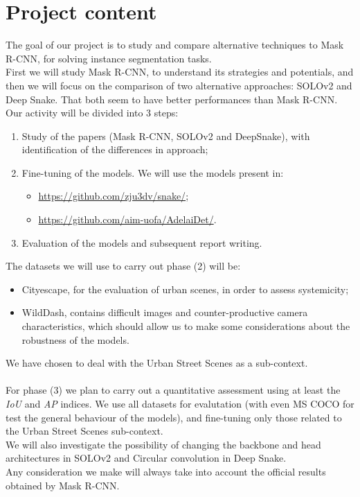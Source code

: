 
\section*{Project content}
The goal of our project is to study and compare alternative techniques to Mask R-CNN, for solving instance segmentation tasks.\\
First we will study Mask R-CNN, to understand its strategies and potentials, and then we will focus on the comparison of two alternative approaches: SOLOv2 and Deep Snake. That both seem to have better performances than Mask R-CNN. Our activity will be divided into 3 steps:
\begin{enumerate}
\item Study of the papers (Mask R-CNN, SOLOv2 and DeepSnake), with identification of the differences in approach;
\item Fine-tuning of the models. We will use the models present in:
\begin{itemize}
\item \url{https://github.com/zju3dv/snake/};
\item \url{https://github.com/aim-uofa/AdelaiDet/}.
\end{itemize}
\noindent
\item Evaluation of the models and subsequent report writing.
\end{enumerate}
\noindent
The datasets we will use to carry out phase (2) will be:
\begin{itemize}
\item Cityescape, for the evaluation of urban scenes, in order to assess systemicity;
\item WildDash, contains difficult images and counter-productive camera characteristics, which should allow us to make some considerations about the robustness of the models.
\end{itemize}
\noindent
We have chosen to deal with the Urban Street Scenes as a sub-context.
\\\\
\noindent
For phase (3) we plan to carry out a quantitative assessment using at least the \textit{IoU} and \textit{AP} indices. We use all datasets for evalutation (with even MS COCO for test the general behaviour of the models), and fine-tuning only those related to the Urban Street Scenes sub-context. \\
We will also investigate the possibility of changing the backbone and head architectures in SOLOv2 and Circular convolution in Deep Snake.\\
Any consideration we make will always take into account the official results obtained by Mask R-CNN.

